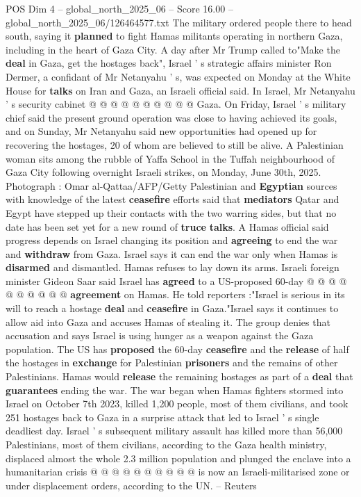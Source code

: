\begin{textsample}{POS Dim 4 – global\_north\_2025\_06 – Score 16.00 – global\_north\_2025\_06/126464577.txt}
The military ordered people there to head south, saying it \textbf{planned} to fight Hamas militants operating in northern Gaza, including in the heart of Gaza City.
A day after Mr Trump called to"Make the \textbf{deal} in Gaza, get the hostages back", Israel ' s strategic affairs minister Ron Dermer, a confidant of Mr Netanyahu ' s, was expected on Monday at the White House for \textbf{talks} on Iran and Gaza, an Israeli official said.
In Israel, Mr Netanyahu ' s security cabinet @ @ @ @ @ @ @ @ @ @ Gaza.
On Friday, Israel ' s military chief said the present ground operation was close to having achieved its goals, and on Sunday, Mr Netanyahu said new opportunities had opened up for recovering the hostages, 20 of whom are believed to still be alive.
A Palestinian woman sits among the rubble of Yaffa School in the Tuffah neighbourhood of Gaza City following overnight Israeli strikes, on Monday, June 30th, 2025.
Photograph : Omar al-Qattaa/AFP/Getty Palestinian and \textbf{Egyptian} sources with knowledge of the latest \textbf{ceasefire} efforts said that \textbf{mediators} Qatar and Egypt have stepped up their contacts with the two warring sides, but that no date has been set yet for a new round of \textbf{truce} \textbf{talks}.
A Hamas official said progress depends on Israel changing its position and \textbf{agreeing} to end the war and \textbf{withdraw} from Gaza.
Israel says it can end the war only when Hamas is \textbf{disarmed} and dismantled.
Hamas refuses to lay down its arms.
Israeli foreign minister Gideon Saar said Israel has \textbf{agreed} to a US-proposed 60-day @ @ @ @ @ @ @ @ @ @ \textbf{agreement} on Hamas.
He told reporters :"Israel is serious in its will to reach a hostage \textbf{deal} and \textbf{ceasefire} in Gaza."Israel says it continues to allow aid into Gaza and accuses Hamas of stealing it.
The group denies that accusation and says Israel is using hunger as a weapon against the Gaza population.
The US has \textbf{proposed} the 60-day \textbf{ceasefire} and the \textbf{release} of half the hostages in \textbf{exchange} for Palestinian \textbf{prisoners} and the remains of other Palestinians.
Hamas would \textbf{release} the remaining hostages as part of a \textbf{deal} that \textbf{guarantees} ending the war.
The war began when Hamas fighters stormed into Israel on October 7th 2023, killed 1,200 people, most of them civilians, and took 251 hostages back to Gaza in a surprise attack that led to Israel ' s single deadliest day.
Israel ' s subsequent military assault has killed more than 56,000 Palestinians, most of them civilians, according to the Gaza health ministry, displaced almost the whole 2.3 million population and plunged the enclave into a humanitarian crisis @ @ @ @ @ @ @ @ @ @ is now an Israeli-militarised zone or under displacement orders, according to the UN. -- Reuters

\end{textsample}
